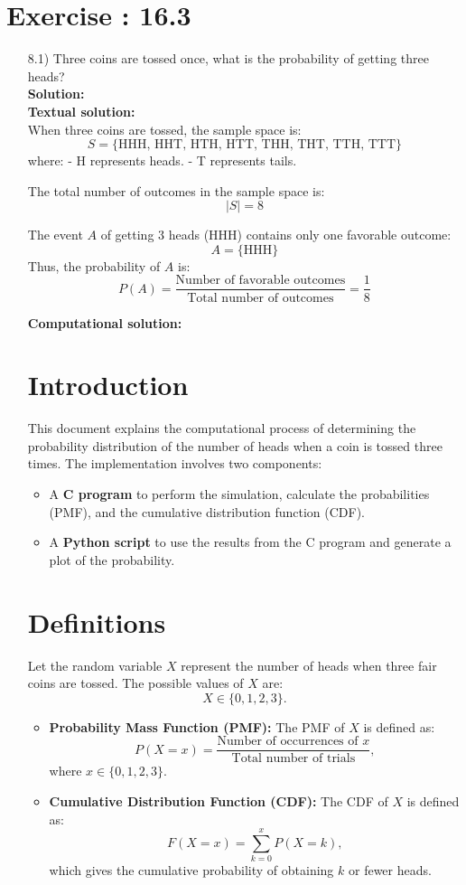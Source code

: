 \documentclass[journal]{IEEEtran}
\begin{document}
\section*{Exercise : 16.3}
\begin{enumerate}
\item [8.1)] Three coins are tossed once, what is the probability of getting three heads?\\
\textbf{Solution:}\\
\textbf{Textual solution: }\\
When three coins are tossed, the sample space is:
\[
S = \{\text{HHH, HHT, HTH, HTT, THH, THT, TTH, TTT}\}
\]
where:
- H represents heads.
- T represents tails.

The total number of outcomes in the sample space is:
\[
|S| = 8
\]

The event \( A \) of getting 3 heads (HHH) contains only one favorable outcome:
\[
A = \{\text{HHH}\}
\]
Thus, the probability of \( A \) is:
\[
P(A) = \frac{\text{Number of favorable outcomes}}{\text{Total number of outcomes}} = \frac{1}{8}
\]

\textbf{Computational solution: }\\

\section*{Introduction}
This document explains the computational process of determining the probability distribution of the number of heads when a coin is tossed three times. The implementation involves two components:
\begin{itemize}
    \item A \textbf{C program} to perform the simulation, calculate the probabilities (PMF), and the cumulative distribution function (CDF).
    \item A \textbf{Python script} to use the results from the C program and generate a plot of the probability.
\end{itemize}

\section*{Definitions}
Let the random variable \( X \) represent the number of heads when three fair coins are tossed. The possible values of \( X \) are:
\[
X \in \{0, 1, 2, 3\}.
\]
\begin{itemize}
    \item \textbf{Probability Mass Function (PMF):} The PMF of \( X \) is defined as:
    \[
    P(X = x) = \frac{\text{Number of occurrences of } x}{\text{Total number of trials}},
    \]
    where \( x \in \{0, 1, 2, 3\} \).
    \item \textbf{Cumulative Distribution Function (CDF):} The CDF of \( X \) is defined as:
    \[
    F(X = x) = \sum_{k=0}^{x} P(X = k),
    \]
    which gives the cumulative probability of obtaining \( k \) or fewer heads.
\end{itemize}


\end{enumerate}
\end{document}
